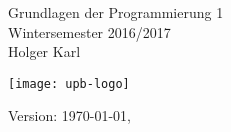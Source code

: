 \documentclass[a4paper,11pt]{memoir}
\begin{document}



\thispagestyle{empty}
\begin{titlingpage}
  \centering 
  \vspace*{5cm}
  {\huge Grundlagen der Programmierung 1}
  \\[2ex]
  {\large Wintersemester 2016/2017}
  \\[2ex]
  {\large Holger Karl}
  \vfill
  \begin{center}
    \texttt{[image: upb-logo]}
  \end{center}
  \vspace{1cm}
  Version: \today, \currenttime
\end{titlingpage}
\pagestyle{companion}


\cleardoublepage
\tableofcontents

\listoffigures
\renewcommand{\listtheoremname}{Liste von Definitionen u.ä.}
\listoftheorems 
\newpage
{}
%
% 
% 


\end{document}
